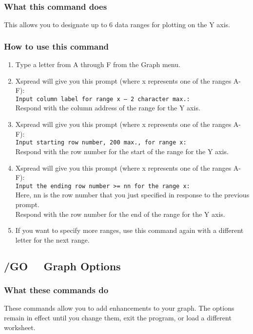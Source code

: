 \subsubsection*{What this command does}
This allows you to designate up to 6 data ranges for plotting on the Y 
axis.

\subsubsection*{How to use this command}
\begin{enumerate}
\item{Type a letter from A through F from the Graph menu.}
\item{Xspread will give you this prompt (where x represents one of the
        ranges A-F):\\
        {\tt Input column label for range x -- 2 character max.:} \\
        Respond with the column address of the range for the Y axis.}
\item{Xspread will give you this prompt (where x represents one of the
        ranges A-F):\\
        {\tt Input starting row number, 200 max., for range x:} \\
        Respond with the row number for the start of the range for the Y
        axis.}
\item{Xspread will give you this prompt (where x represents one of the
        ranges A-F):\\
        {\tt Input the ending row number >= nn for the range x:} \\
        Here, nn is the row number that you just specified in response to
        the previous prompt.\\
        Respond with the row number for the end of the range for the Y
        axis.}
\item{If you want to specify more ranges, use this command again with a
        different letter for the next range.}
\end{enumerate}

\subsection*{/GO \ \     Graph Options}

\subsubsection*{What these commands do}
These commands allow you to add enhancements to your graph.  The 
options remain in effect until you change them, exit the program, or 
load a different worksheet.

